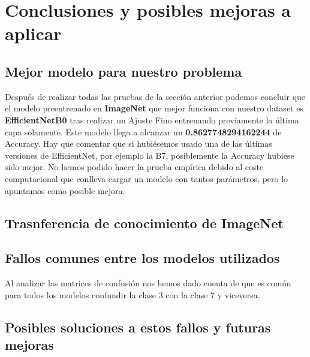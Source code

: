 \section{Conclusiones y posibles mejoras a aplicar}

\subsection{Mejor modelo para nuestro problema}

Después de realizar todas las pruebas de la sección anterior podemos concluir que el modelo preentrenado en \textbf{ImageNet} que mejor funciona con nuestro dataset es \textbf{EfficientNetB0} tras realizar un Ajuste Fino entrenando previamente la última capa solamente. Este modelo llega a alcanzar un \textbf{0.8627748294162244} de Accuracy. Hay que comentar que si hubiésemos usado una de las últimas versiones de EfficientNet, por ejemplo la B7, posiblemente la Accuracy hubiese sido mejor. No hemos podido hacer la prueba empírica debido al coste computacional que conlleva cargar un modelo con tantos parámetros, pero lo apuntamos como posible mejora.

\subsection{Trasnferencia de conocimiento de ImageNet}


\subsection{Fallos comunes entre los modelos utilizados}

Al analizar las matrices de confusión nos hemos dado cuenta de que es común para todos los modelos confundir la clase 3 con la clase 7 y viceversa. 

\subsection{Posibles soluciones a estos fallos y futuras mejoras}
